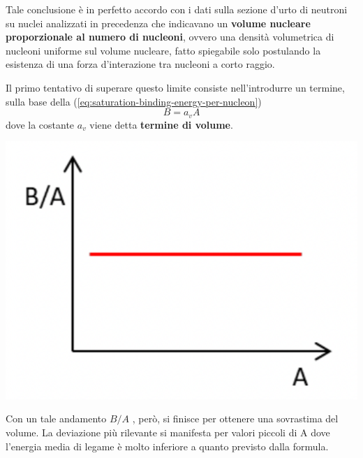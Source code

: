 Tale conclusione è in perfetto accordo con i dati sulla sezione d'urto
di neutroni su nuclei analizzati in precedenza che indicavano un \textbf{volume
nucleare proporzionale al numero di nucleoni}, ovvero una densità
volumetrica di nucleoni uniforme sul volume nucleare, fatto spiegabile
solo postulando la esistenza di una forza d'interazione tra nucleoni a
corto raggio.

Il primo tentativo di superare questo limite consiste nell'introdurre un
termine, sulla base della (\ref{eq:saturation-binding-energy-per-nucleon})
\begin{equation}
	B = a_{v} A
   \label{eq:volume-term-drop-model}
\end{equation}
dove la costante \(a_{v}\) viene detta \textbf{termine di volume}.
\begin{marginfigure}
	\includegraphics{figs/goccia1}
	\label{fig:goccia1}
\end{marginfigure}
Con un tale andamento \(B / A\) , però, si finisce per ottenere una sovrastima
del volume.
La deviazione più rilevante si manifesta per valori piccoli di A dove
l'energia media di legame è molto inferiore a quanto previsto dalla
formula.
\bigskip

